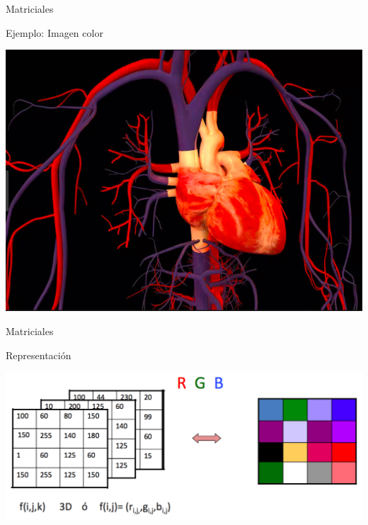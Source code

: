 \documentclass{bredelebeamer}
\begin{document}
\begin{frame}{Matriciales}
\begin{center}
Ejemplo: Imagen color
\end{center}
\begin{center}
\includegraphics[scale=0.3]{images/img44.png}
\end{center}
\end{frame}

\begin{frame}{Matriciales}
\begin{center}
Representación
\end{center}
\begin{center}
\includegraphics[scale=0.3]{images/img45.png}
\end{center}
\end{frame}
\end{document}
